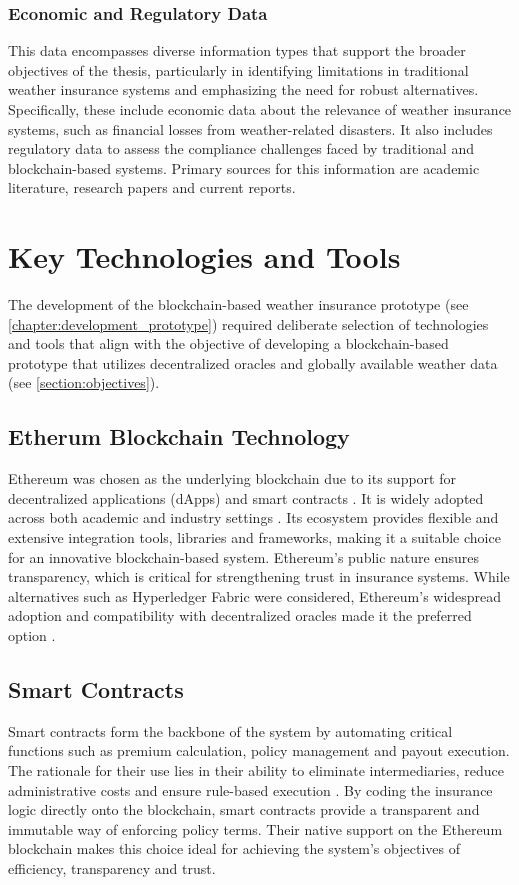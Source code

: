 \subsubsection{Economic and Regulatory Data}
This data encompasses diverse information types that support the broader objectives of the thesis, particularly in identifying limitations in traditional weather insurance systems and emphasizing the need for robust alternatives. Specifically, these include economic data about the relevance of weather insurance systems, such as financial losses from weather-related disasters. It also includes regulatory data to assess the compliance challenges faced by traditional and blockchain-based systems. Primary sources for this information are academic literature, research papers and current reports.

\section{Key Technologies and Tools}\label{section:prototype_development}
The development of the blockchain-based weather insurance prototype (see \cref{chapter:development_prototype}) required deliberate selection of technologies and tools that align with the objective of developing a blockchain-based prototype that utilizes decentralized oracles and globally available weather data (see \cref{section:objectives}).

\subsection{Etherum Blockchain Technology}
Ethereum was chosen as the underlying blockchain due to its support for decentralized applications (dApps) and smart contracts \autocite{Oliva2020An}. It is widely adopted across both academic and industry settings \autocite{Kosmarski2020Blockchain}. Its ecosystem provides flexible and extensive integration tools, libraries and frameworks, making it a suitable choice for an innovative blockchain-based system. Ethereum's public nature ensures transparency, which is critical for strengthening trust in insurance systems. While alternatives such as Hyperledger Fabric were considered, Ethereum's widespread adoption and compatibility with decentralized oracles made it the preferred option \autocite{ferreira2021regulating}.

\subsection{Smart Contracts}
Smart contracts form the backbone of the system by automating critical functions such as premium calculation, policy management and payout execution. The rationale for their use lies in their ability to eliminate intermediaries, reduce administrative costs and ensure rule-based execution \autocite{Zheng2019An}. By coding the insurance logic directly onto the blockchain, smart contracts provide a transparent and immutable way of enforcing policy terms. Their native support on the Ethereum blockchain makes this choice ideal for achieving the system's objectives of efficiency, transparency and trust.

